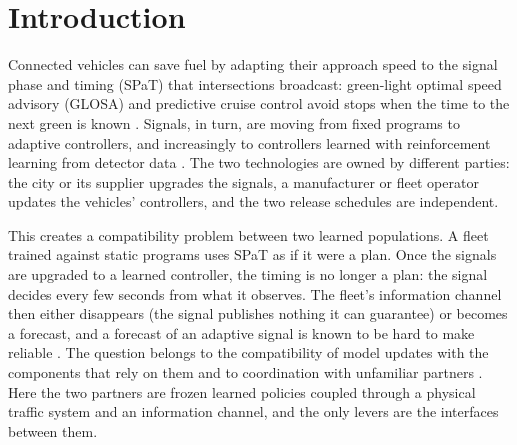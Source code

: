 \section{Introduction}\label{sec:intro}
Connected vehicles can save fuel by adapting their approach speed to the signal phase and timing (SPaT) that intersections broadcast:
green-light optimal speed advisory (GLOSA) and predictive cruise control avoid stops when the time to the next green is known
\cite{katsaros2011,asadi2011}. Signals, in turn, are moving from fixed programs to adaptive controllers, and increasingly to controllers
learned with reinforcement learning from detector data \cite{varaiya2013,wei2018,wei2019,ault2021}. The two technologies are owned by
different parties: the city or its supplier upgrades the signals, a manufacturer or fleet operator updates the vehicles' controllers, and
the two release schedules are independent.

This creates a compatibility problem between two learned populations. A fleet trained against static programs uses SPaT as if it were a
plan. Once the signals are upgraded to a learned controller, the timing is no longer a plan: the signal decides every few seconds from what
it observes. The fleet's information channel then either disappears (the signal publishes nothing it can guarantee) or becomes a forecast,
and a forecast of an adaptive signal is known to be hard to make reliable \cite{stevanovic2013,bodenheimer2014,mahler2014,genser2024,eteifa2025}. The
question belongs to the compatibility of model updates with the components that rely on them \cite{bansal2019,shen2020,yan2021} and to
coordination with unfamiliar partners \cite{stone2010,hu2020}. Here the two partners are frozen learned policies coupled through a
physical traffic system and an information channel, and the only levers are the interfaces between them.

